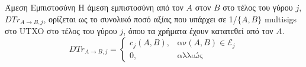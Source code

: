 {}
\begin{definitiongr}{Άμεση Εμπιστοσύνη}
  Η άμεση εμπιστοσύνη από τον $A$ στον $B$ στο τέλος του γύρου $j$, $DTr_{A \rightarrow B, j}$, ορίζεται ως το συνολικό ποσό
  αξίας που υπάρχει σε 1/$\{A,B\}$ \textlatin{multisigs} στο \textlatin{UTXO} στο τέλος του γύρου $j$, όπου τα χρήματα έχουν
  κατατεθεί από τον $A$.
  \begin{equation}
    DTr_{A \rightarrow B, j} =
      \begin{cases}
        c_j\left(A, B\right), & \mbox{αν} \left(A, B\right) \in \mathcal{E}_j \\
        0, & \mbox{αλλιώς}
      \end{cases}
  \end{equation}
\end{definitiongr}
